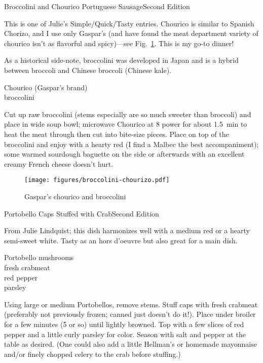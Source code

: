 \begin{entry}{Broccolini and Chourico Portuguese Sausage}{Second Edition}

\begin{open}
    This is one of Julie's Simple/Quick/Tasty entries.  Chourico is similar to
    Spanish Chorizo, and I use only Gaspar's (and have found the meat department
    variety of chourico isn't as flavorful and spicy)---see
    Fig.~\ref{fig:chourico}. This is my go-to dinner!

    As a historical side-note, broccolini was developed in Japan and is a hybrid
    between broccoli and Chinese broccoli (Chinese kale).
\end{open}
\begin{ingredients}
    Chourico (Gaspar's brand)\\
    broccolini
\end{ingredients}
Cut up raw broccolini (stems especially are so much sweeter than broccoli) and
place in wide soup bowl; microwave Chourico at 8 power for about
\SI{1.5}{\minute} to heat the meat through then cut into bite-size pieces.
Place on top of the broccolini and enjoy with a hearty red (I find a Malbec the
best accompaniment); some warmed sourdough baguette on the side or afterwards
with an excellent creamy French cheese doesn't hurt.
\begin{figure}[h]
  \centering
  \texttt{[image: figures/broccolini-chourizo.pdf]}
  \caption{Gaspar's chourico and broccolini}
  \label{fig:chourico}
\end{figure}

\end{entry}

\begin{entry}{Portobello Caps Stuffed with Crab}{Second Edition}

\begin{open}
  From Julie Lindquist; this dish harmonizes well with a medium red or a
  hearty semi-sweet white. Tasty as an hors d'oeuvre but also great for a main
  dish.
\end{open}
\begin{ingredients}
    Portobello mushrooms\\
    fresh crabmeat\\
    red pepper\\
    parsley
\end{ingredients}
Using large or medium Portobellos, remove stems. Stuff caps with fresh
crabmeat (preferably not previously frozen; canned just doesn't do it!). Place
under broiler for a few minutes (5 or so) until lightly browned. Top with a
few slices of red pepper and a little curly parsley for color. Season with
salt and pepper at the table as desired.  (One could also add a little
Hellman's or homemade mayonnaise and/or finely chopped celery to the crab
before stuffing.)
\end{entry}

